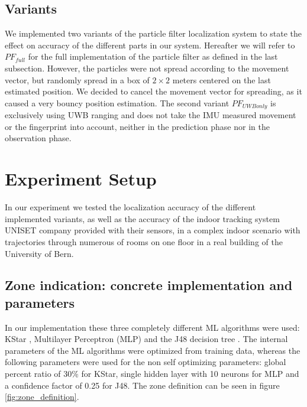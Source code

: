 \subsection{Variants}
We implemented two variants of the particle filter localization system to state the effect on accuracy of the different parts in our system.
Hereafter we will refer to $PF_{full}$ for the full implementation of the particle filter as defined in the last subsection. However, the particles were not spread according to the movement vector, but randomly spread in a box of $2 \times 2$ meters centered on the last estimated position. We decided to cancel the movement vector for spreading, as it caused a very bouncy position estimation.
The second variant $PF_{UWBonly}$ is exclusively using UWB ranging and does not take the IMU measured movement or the fingerprint into account, neither in the prediction phase nor in the observation phase. 



\section{Experiment Setup}
In our experiment we tested the localization accuracy of the different implemented variants, as well as the accuracy of the indoor tracking system UNISET company provided with their sensors, in a complex indoor scenario with trajectories through numerous of rooms on one floor in a real building of the University of Bern.

\subsection{Zone indication: concrete implementation and parameters}
In our implementation these three completely different ML algorithms were used: KStar \cite{KStar}, Multilayer Perceptron (MLP) \cite{MLP} and the J48 decision tree \cite{J48}. 
The internal parameters of the ML algorithms were optimized from training data, whereas the following parameters were used for the non self optimizing parameters: global percent ratio of 30\% for KStar, single hidden layer with 10 neurons for MLP and a confidence factor of 0.25 for J48.
The zone definition can be seen in figure \ref{fig:zone_definition}.

